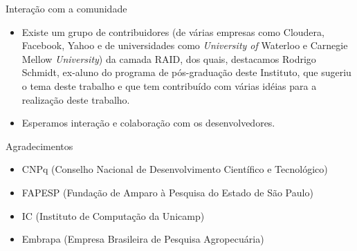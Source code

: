  \begin{frame}{Interação com a comunidade}
   \begin{itemize}
      \item Existe um grupo de contribuidores (de várias empresas como Cloudera, Facebook, Yahoo e de universidades como \emph{University of} Waterloo e Carnegie Mellow \emph{University}) da camada RAID, dos quais, destacamos Rodrigo Schmidt, ex-aluno do programa de pós-graduação deste Instituto, que sugeriu o tema deste trabalho e que tem contribuído com várias idéias para a realização deste trabalho.
      \item Esperamos interação e colaboração com os desenvolvedores.
   \end{itemize}
 \end{frame}

\begin{frame}{Agradecimentos}

   \begin{itemize}
        \item CNPq (Conselho Nacional de Desenvolvimento Científico e Tecnológico)
        \item FAPESP (Fundação de Amparo à Pesquisa do Estado de São Paulo)
        \item IC (Instituto de Computação da Unicamp)
        \item Embrapa (Empresa Brasileira de Pesquisa Agropecuária)
  \end{itemize}

\end{frame}
